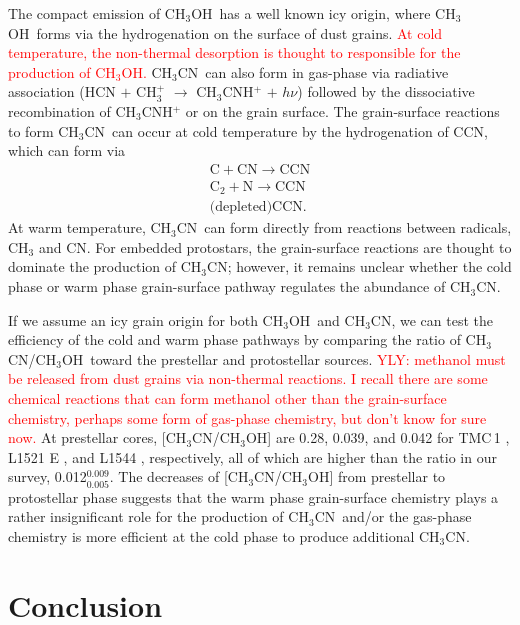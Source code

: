 \documentclass[twocolumn]{aastex62}
\newcommand{\methanol}{\mbox{CH$_{3}$OH}}
\newcommand{\methylcyanide}{\mbox{CH$_{3}$CN}}
\begin{document}
The compact emission of \methanol\ has a well known icy origin, where \methanol\ forms via the hydrogenation on the surface of dust grains.  \textcolor{red}{At cold temperature, the non-thermal desorption is thought to responsible for the production of \methanol.}  \methylcyanide\ can also form in gas-phase via radiative association (HCN $+$ CH$_3^+$ $\rightarrow$ CH$_3$CNH$^+$ $+$ $h\nu$) followed by the dissociative recombination of CH$_3$CNH$^+$ or on the grain surface.  The grain-surface reactions to form \methylcyanide\ can occur at cold temperature by the hydrogenation of CCN, which can form via
\begin{align}
  \text{C} + \text{CN} \rightarrow \text{CCN} \nonumber \\
  \text{C}_2 + \text{N} \rightarrow \text{CCN} \nonumber \\
  \text{(depleted)} \text{CCN}.
\end{align}
At warm temperature, \methylcyanide\ can form directly from reactions between radicals, CH$_3$ and CN.  For embedded protostars, the grain-surface reactions are thought to dominate the production of \methylcyanide; however, it remains unclear whether the cold phase or warm phase grain-surface pathway regulates the abundance of \methylcyanide.  

If we assume an icy grain origin for both \methanol\ and \methylcyanide, we can test the efficiency of the cold and warm phase pathways by comparing the ratio of \methylcyanide/\methanol\ toward the prestellar and protostellar sources.  \textcolor{red}{YLY: methanol must be released from dust grains via non-thermal reactions.  I recall there are some chemical reactions that can form methanol other than the grain-surface chemistry, perhaps some form of gas-phase chemistry, but don't know for sure now.}  At prestellar cores, [\methylcyanide/\methanol] are 0.28, 0.039, and 0.042 for TMC\,1 \citep{2016ApJS..225...25G}, L1521 E \citep{2019A&A...630A.136N}, and L1544 \citep{2019A&A...630A.136N}, respectively, all of which are higher than the ratio in our survey, 0.012$^{0.009}_{0.005}$.  The decreases of [\methylcyanide/\methanol] from prestellar to protostellar phase suggests that the warm phase grain-surface chemistry plays a rather insignificant role for the production of \methylcyanide\ and/or the gas-phase chemistry is more efficient at the cold phase to produce additional \methylcyanide.

\section{Conclusion}
\end{document}
